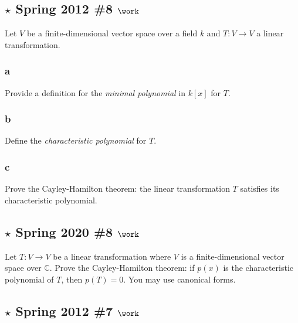 \hypertarget{star-spring-2012-8-work}{%
\subsection{\texorpdfstring{\(\star\) Spring 2012 \#8
\(\work\)}{\textbackslash star Spring 2012 \#8 \textbackslash work}}\label{star-spring-2012-8-work}}

Let \(V\) be a finite-dimensional vector space over a field \(k\) and
\(T:V\to V\) a linear transformation.

\hypertarget{a-107}{%
\subsubsection{a}\label{a-107}}

Provide a definition for the \emph{minimal polynomial} in \(k[x]\) for
\(T\).

\hypertarget{b-97}{%
\subsubsection{b}\label{b-97}}

Define the \emph{characteristic polynomial} for \(T\).

\hypertarget{c-58}{%
\subsubsection{c}\label{c-58}}

Prove the Cayley-Hamilton theorem: the linear transformation \(T\)
satisfies its characteristic polynomial.

\hypertarget{star-spring-2020-8-work}{%
\subsection{\texorpdfstring{\(\star\) Spring 2020 \#8
\(\work\)}{\textbackslash star Spring 2020 \#8 \textbackslash work}}\label{star-spring-2020-8-work}}

Let \(T:V\to V\) be a linear transformation where \(V\) is a
finite-dimensional vector space over \({\mathbb{C}}\). Prove the
Cayley-Hamilton theorem: if \(p(x)\) is the characteristic polynomial of
\(T\), then \(p(T) = 0\). You may use canonical forms.

\hypertarget{star-spring-2012-7-work}{%
\subsection{\texorpdfstring{\(\star\) Spring 2012 \#7
\(\work\)}{\textbackslash star Spring 2012 \#7 \textbackslash work}}\label{star-spring-2012-7-work}}

